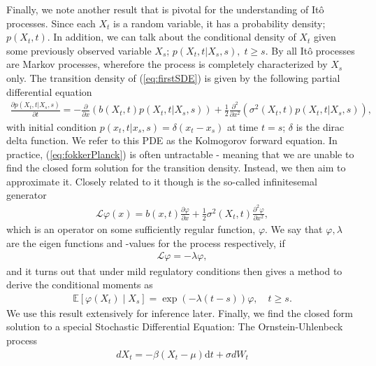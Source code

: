 Finally, we note another result that is pivotal for the understanding of Itô processes. Since each $X_t$ is a random variable, it has a probability density; $p(X_t, t)$. In addition, we can talk about the conditional density of $X_t$ given some previously observed variable $X_s$; $p(X_t, t | X_s, s), \; t\geq s$. By \cite[theorem 7.1.2]{Oksendal2003_yu} all Itô processes are Markov processes, wherefore the process is completely characterized by $X_s$ only. The transition density of (\ref{eq:firstSDE}) is given by the following partial differential equation
\begin{align}
    \frac{\partial p(X_t, t | X_s, s)}{\partial t} = -\frac{\partial}{\partial x}\left(b(X_t, t)p(X_t, t | X_s, s)\right) + \frac{1}{2}\frac{\partial^2}{\partial x^2}\left(\sigma^2(X_t, t)p(X_t, t | X_s, s)\right),\label{eq:fokkerPlanck} 
\end{align}
with initial condition $p(x_t, t|x_s, s) = \delta(x_t - x_s)$ at time $t = s$; $\delta$ is the dirac delta function. We refer to this PDE as the Kolmogorov forward equation. In practice, (\ref{eq:fokkerPlanck}) is often untractable - meaning that we are unable to find the closed form solution for the transition density. Instead, we then aim to approximate it. Closely related to it though is the so-called infinitesemal generator 
\begin{align}
    \mathcal{L}\varphi(x) = b(x, t) \frac{\partial\varphi}{\partial x} + \frac{1}{2}\sigma^2(X_t, t)\frac{\partial^2\varphi}{\partial x^2} \label{eq:infinitesemalGeneratorDefinition},
\end{align}
which is an operator on some sufficiently regular function, $\varphi$. We say that $\varphi, \lambda$ are the eigen functions and -values for the process respectively, if 
\begin{align}
    \mathcal{L}\varphi = -\lambda\varphi,
\end{align} 
and it turns out that under mild regulatory conditions \cite[theorem 1.16]{StatisticalMethodsForSDE} then gives a method to derive the conditional moments as
\begin{align}
    \mathbb{E}\left[\varphi(X_{t}) \middle | X_{s}\right] = \exp\left(-\lambda \left(t - s\right)\right)\varphi \label{eq:momentConditions}, \quad t\geq s.
\end{align}
We use this result extensively for inference later. Finally, we find the closed form solution to a special Stochastic Differential Equation: The Ornstein-Uhlenbeck process 
\begin{align}
    dX_t = -\beta\left(X_t - \mu\right)\mathrm{d}t + \sigma dW_t \label{eq:originalOUprocess}
\end{align}
